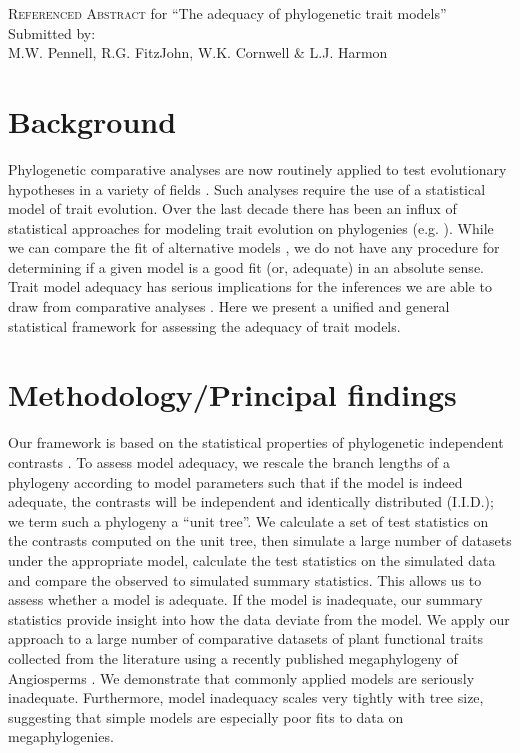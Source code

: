 \documentclass[a4paper,12pt]{article}
\begin{document}
\begin{flushleft}
\textsc{Referenced Abstract} for ``The adequacy of phylogenetic trait models''\\[0.5cm]
Submitted by:\\
M.W. Pennell, R.G. FitzJohn, W.K. Cornwell \& L.J. Harmon
\end{flushleft}

\section*{Background}

Phylogenetic comparative analyses are now routinely applied to test evolutionary hypotheses in a variety of fields \citep{PennellHarmon}. Such analyses require the use of a statistical model of trait evolution. Over the last decade there has been an influx of statistical approaches for modeling trait evolution on phylogenies (e.g. \citep{ButlerKing2004, Omeara2006, Eastman2011, Beaulieu2012}). While we can compare the fit of alternative models \citep{Harmon2010}, we do not have any procedure for determining if a given model is a good fit (or, adequate) in an absolute sense. Trait model adequacy has serious implications for the inferences we are able to draw from comparative analyses \citep{Boettiger2012, SlaterPennell}. Here we present a unified and general statistical framework for assessing the adequacy of trait models.

\section*{Methodology/Principal findings}

Our framework is based on the statistical properties of phylogenetic independent contrasts \citep{Felsenstein1985}. To assess model adequacy, we rescale the branch lengths of a phylogeny according to model parameters such that if the model is indeed adequate, the contrasts will be independent and identically distributed (I.I.D.); we term such a phylogeny a ``unit tree''. We calculate a set of test statistics on the contrasts computed on the unit tree, then simulate a large number of datasets under the appropriate model, calculate the test statistics on the simulated data and compare the observed to simulated summary statistics. This allows us to assess whether a model is adequate. If the model is inadequate, our summary statistics provide insight into how the data deviate from the model. We apply our approach to a large number of comparative datasets of plant functional traits collected from the literature using a recently published megaphylogeny of Angiosperms \citep{Zanne2013}. We demonstrate that commonly applied models are seriously inadequate. Furthermore, model inadequacy scales very tightly with tree size, suggesting that simple models are especially poor fits to data on megaphylogenies.
\end{document}
